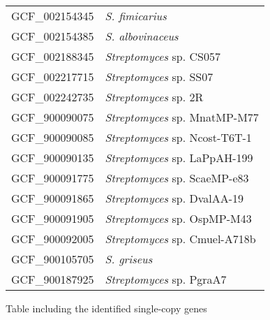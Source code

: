 \begin{longtable}{p{0.5\asdf}p{0.5\asdf}}
	GCF\_002154345 	&	\emph{S. fimicarius}	\\
	GCF\_002154385 	&	\emph{S. albovinaceus}	\\
	GCF\_002188345 	&	\emph{Streptomyces} sp. CS057	\\
	GCF\_002217715 	&	\emph{Streptomyces} sp. SS07	\\
	GCF\_002242735 	&	\emph{Streptomyces} sp. 2R	\\
	GCF\_900090075 	&	\emph{Streptomyces} sp. MnatMP-M77	\\
	GCF\_900090085 	&	\emph{Streptomyces} sp. Ncost-T6T-1	\\
	GCF\_900090135 	&	\emph{Streptomyces} sp. LaPpAH-199	\\
	GCF\_900091775 	&	\emph{Streptomyces} sp. ScaeMP-e83	\\
	GCF\_900091865 	&	\emph{Streptomyces} sp. DvalAA-19	\\
	GCF\_900091905 	&	\emph{Streptomyces} sp. OspMP-M43	\\
	GCF\_900092005 	&	\emph{Streptomyces} sp. Cmuel-A718b	\\
	GCF\_900105705 	&	\emph{S. griseus}	\\
	GCF\_900187925 	&	\emph{Streptomyces} sp. PgraA7	\\
	\bottomrule
\end{longtable}
	Table including the identified single-copy genes

